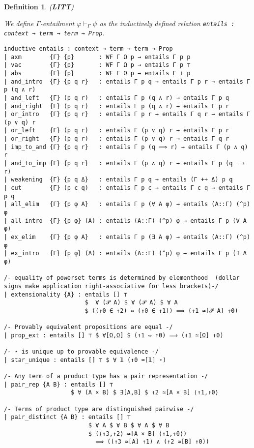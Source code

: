 \documentclass[12pt,leqno]{article}
\def\lc{\lstinline}
\theoremstyle{example}
\newtheorem{definition}[theorem]{Definition}
\numberwithin{equation}{section}
\begin{document}
\begin{definition}(\textbf{LITT})

  \label{def:LITT:entails}
  We define $\Gamma$-entailment $\varphi \vdash_\Gamma \psi$ as the inductively defined relation \lc{entails : context → term → term → Prop}. 
\begin{lstlisting}[basicstyle=\small\ttfamily, frame=single]
inductive entails : context → term → term → Prop
| axm        {Γ} {p}       : WF Γ Ω p → entails Γ p p
| vac        {Γ} {p}       : WF Γ Ω p → entails Γ p ⊤
| abs        {Γ} {p}       : WF Γ Ω p → entails Γ ⊥ p
| and_intro  {Γ} {p q r}   : entails Γ p q → entails Γ p r → entails Γ p (q ∧ r)
| and_left   {Γ} (p q r)   : entails Γ p (q ∧ r) → entails Γ p q
| and_right  {Γ} (p q r)   : entails Γ p (q ∧ r) → entails Γ p r
| or_intro   {Γ} {p q r}   : entails Γ p r → entails Γ q r → entails Γ (p ∨ q) r
| or_left    {Γ} (p q r)   : entails Γ (p ∨ q) r → entails Γ p r
| or_right   {Γ} (p q r)   : entails Γ (p ∨ q) r → entails Γ q r
| imp_to_and {Γ} {p q r}   : entails Γ p (q ⟹ r) → entails Γ (p ∧ q) r
| and_to_imp {Γ} {p q r}   : entails Γ (p ∧ q) r → entails Γ p (q ⟹ r)
| weakening  {Γ} {p q Δ}   : entails Γ p q → entails (Γ ++ Δ) p q
| cut        {Γ} (p c q)   : entails Γ p c → entails Γ c q → entails Γ p q
| all_elim   {Γ} {p φ A}   : entails Γ p (∀ A φ) → entails (A::Γ) (^p) φ
| all_intro  {Γ} {p φ} (A) : entails (A::Γ) (^p) φ → entails Γ p (∀ A φ)
| ex_elim    {Γ} {p φ A}   : entails Γ p (∃ A φ) → entails (A::Γ) (^p) φ
| ex_intro   {Γ} {p φ} (A) : entails (A::Γ) (^p) φ → entails Γ p (∃ A φ)

/- equality of powerset terms is determined by elementhood  (dollar signs make application right-associative for less brackets)-/
| extensionality {A} : entails [] ⊤
                       $  ∀ (𝒫 A) $ ∀ (𝒫 A) $ ∀ A 
                       $ ((↑0 ∈ ↑2) ⇔ (↑0 ∈ ↑1)) ⟹ (↑1 ≃[𝒫 A] ↑0)

/- Provably equivalent propositions are equal -/
| prop_ext : entails [] ⊤ $ ∀[Ω,Ω] $ (↑1 ⇔ ↑0) ⟹ (↑1 ≃[Ω] ↑0)

/- ⋆ is unique up to provable equivalence -/
| star_unique : entails [] ⊤ $ ∀ 𝟙 (↑0 ≃[𝟙] ⋆)

/- Any term of a product type has a pair representation -/
| pair_rep {A B} : entails [] ⊤
                   $ ∀ (A × B) $ ∃[A,B] $ ↑2 ≃[A × B] ⟨↑1,↑0⟩

/- Terms of product type are distinguished pairwise -/
| pair_distinct {A B} : entails [] ⊤
                        $ ∀ A $ ∀ B $ ∀ A $ ∀ B
                        $ (⟨↑3,↑2⟩ ≃[A × B] ⟨↑1,↑0⟩)
                          ⟹ ((↑3 ≃[A] ↑1) ∧ (↑2 ≃[B] ↑0))


\end{lstlisting}
\end{definition}
\end{document}
